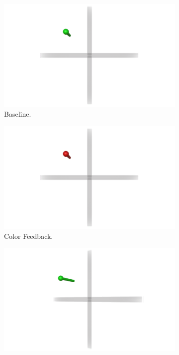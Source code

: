 \begin{figure}[t!]
    \begin{center}
        \begin{subfigure}{0.32\textwidth}
            \includegraphics[trim={5cm 0 5cm 0},clip,width=\linewidth]{figures/AR/Baseline.png}
            \caption[Baseline]{Baseline.}
            \label{fig:designs_baseline}
        \end{subfigure}\hfill
        \begin{subfigure}{0.32\textwidth}
            \includegraphics[trim={5cm 0 5cm 0},clip,width=\linewidth]{figures/AR/Color.png}
            \caption[Color Feedback]{Color Feedback.}
            \label{fig:designs_feedback}
        \end{subfigure}\hfill
        \begin{subfigure}{0.32\textwidth}
            \includegraphics[trim={5cm 0 5cm 0},clip,width=\linewidth]{figures/AR/Angled.png}

\end{subfigure}
\end{center}
\end{figure}
